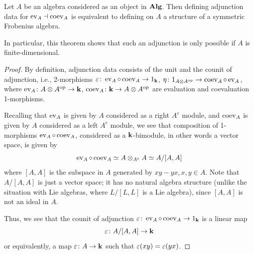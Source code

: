 \begin{theorem}\label{t:adjunction-frob}
  Let $A$ be an algebra considered as an object in $\mathbf{Alg}$. Then defining
  adjunction data for $\operatorname{ev}_A\dashv\operatorname{coev}_A$ is equivalent to defining on $A$ a
  structure of a symmetric Frobenius algebra.
\end{theorem}
In particular, this theorem shows that such an adjunction is only possible if
$A$ is finite-dimensional.
\begin{proof}

  By definition, adjunction data consists of the unit and the counit of adjunction, i.e.,
  2-morphisms $\varepsilon \colon \operatorname{ev}_A\circ \operatorname{coev}_A \to 1_{\mathbf{k}}$, $\eta \colon
  1_{A\otimes A^{\mathrm{op}}}\to \operatorname{coev}_A\circ \operatorname{ev}_A$, where $\operatorname{ev}_A\colon A\otimes
  A^{\mathrm{op}}\to\mathbf{k}$, $\operatorname{coev}_A \colon \mathbf{k} \to A\otimes A^{\mathrm{op}}$ are evaluation and
  coevaluation 1-morphisms.

  Recalling that $\operatorname{ev}_A$ is given by $A$ considered as a right $A^e$ module, and
  $\operatorname{coev}_A$ is given by $A$ considered as a left $A^e$ module, we see that
  composition of 1-morphisms $\operatorname{ev}_A \circ \operatorname{coev}_A$,
  considered as a $\mathbf{k}$-bimodule, in other words a vector space, is given by
  $$
  \operatorname{ev}_A \circ \operatorname{coev}_A \simeq A\otimes_{A^e} A\simeq A/[A,A]
  $$
  where $[A,A]$ is the subspace in $A$ generated by $xy-yx, x,y\in A$.
  Note that $A/[A,A]$ is just a vector space; it has no natural algebra
  structure (unlike the situation with Lie algebras, where $L/[L,L]$ is
  a Lie algebra), since $[A,A]$ is not an ideal in $A$.


  Thus, we see that the counit of adjunction
  $\varepsilon\colon \operatorname{ev}_A \circ \operatorname{coev}_A\to 1_{\mathbf{k}}$
  is a linear map
  $$
    \varepsilon\colon A/[A,A]\to \mathbf{k}
  $$
  or equivalently, a map $\varepsilon \colon A\to \mathbf{k}$ such that $\varepsilon(xy)=\varepsilon(yx)$.


\end{proof}
